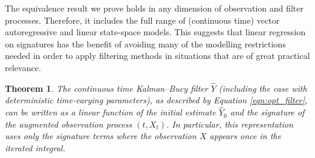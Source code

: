 \documentclass[a4paper, 12pt]{article}
\newtheorem{theorem}{Theorem}
\theoremstyle{remark}
\begin{document}
The equivalence result we prove holds in any dimension of observation and filter processes. Therefore, it includes the full range of (continuous time) vector autoregressive and linear state-space models. This suggests that linear regression on signatures has the benefit of avoiding many of the modelling restrictions needed in order to apply filtering methods in situations that are of great practical relevance.

\begin{theorem}\label{thm:KalmanRepresentation}
The continuous time Kalman--Bucy filter $\hat Y$ (including the case with deterministic time-varying parameters), as described by Equation \eqref{eqn:opt_filter}, can be written as a linear function of the initial estimate $\hat Y_0$ and the signature of the augmented observation process $(t,X_t)$. In particular, this representation uses only the signature terms where the observation $X$ appears once in the iterated integral.
\end{theorem}
\end{document}
